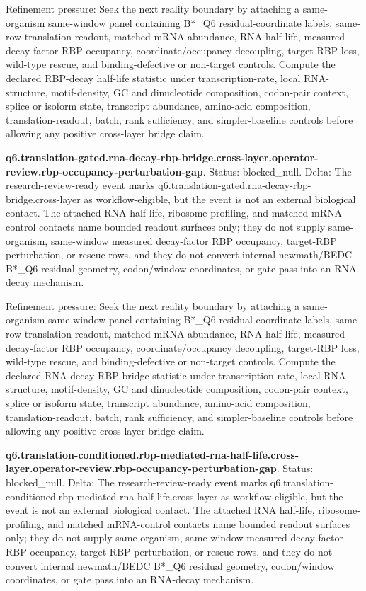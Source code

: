 Refinement pressure: Seek the next reality boundary by attaching a same-organism same-window panel containing B*\_Q6 residual-coordinate labels, same-row translation readout, matched mRNA abundance, RNA half-life, measured decay-factor RBP occupancy, coordinate/occupancy decoupling, target-RBP loss, wild-type rescue, and binding-defective or non-target controls. Compute the declared RBP-decay half-life statistic under transcription-rate, local RNA-structure, motif-density, GC and dinucleotide composition, codon-pair context, splice or isoform state, transcript abundance, amino-acid composition, translation-readout, batch, rank sufficiency, and simpler-baseline controls before allowing any positive cross-layer bridge claim.

\textbf{q6.translation-gated.rna-decay-rbp-bridge.cross-layer.operator-review.rbp-occupancy-perturbation-gap}. Status: blocked\_null. Delta: The research-review-ready event marks q6.translation-gated.rna-decay-rbp-bridge.cross-layer as workflow-eligible, but the event is not an external biological contact. The attached RNA half-life, ribosome-profiling, and matched mRNA-control contacts name bounded readout surfaces only; they do not supply same-organism, same-window measured decay-factor RBP occupancy, target-RBP perturbation, or rescue rows, and they do not convert internal newmath/BEDC B*\_Q6 residual geometry, codon/window coordinates, or gate pass into an RNA-decay mechanism.

Refinement pressure: Seek the next reality boundary by attaching a same-organism same-window panel containing B*\_Q6 residual-coordinate labels, same-row translation readout, matched mRNA abundance, RNA half-life, measured decay-factor RBP occupancy, coordinate/occupancy decoupling, target-RBP loss, wild-type rescue, and binding-defective or non-target controls. Compute the declared RNA-decay RBP bridge statistic under transcription-rate, local RNA-structure, motif-density, GC and dinucleotide composition, codon-pair context, splice or isoform state, transcript abundance, amino-acid composition, translation-readout, batch, rank sufficiency, and simpler-baseline controls before allowing any positive cross-layer bridge claim.

\textbf{q6.translation-conditioned.rbp-mediated-rna-half-life.cross-layer.operator-review.rbp-occupancy-perturbation-gap}. Status: blocked\_null. Delta: The research-review-ready event marks q6.translation-conditioned.rbp-mediated-rna-half-life.cross-layer as workflow-eligible, but the event is not an external biological contact. The attached RNA half-life, ribosome-profiling, and matched mRNA-control contacts name bounded readout surfaces only; they do not supply same-organism, same-window measured decay-factor RBP occupancy, target-RBP perturbation, or rescue rows, and they do not convert internal newmath/BEDC B*\_Q6 residual geometry, codon/window coordinates, or gate pass into an RNA-decay mechanism.

